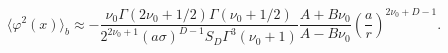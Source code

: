 \begin{equation}\label{phi2rgga}
\langle \varphi ^{2}(x)\rangle _{b}\approx -\frac{\nu _0\Gamma
(2\nu _0+1/2)\Gamma (\nu _0+1/2)}{2^{2\nu _0+1}(a\sigma
)^{D-1}S_D\Gamma ^3(\nu _0+1)}\frac{A+B\nu _0}{A-B\nu _0}\left(
\frac{a}{r}\right) ^{2\nu _0+D-1}.
\end{equation}

